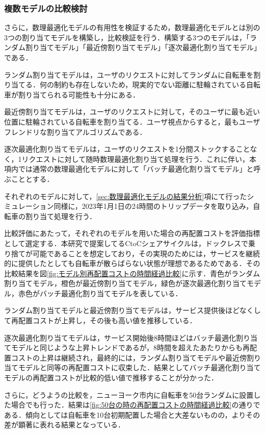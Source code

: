           
      \subsubsection{複数モデルの比較検討}
        \label{sec:複数モデルの比較検討}
          \par さらに，数理最適化モデルの有用性を検証するため，数理最適化モデルとは別の3つの割り当てモデルを構築し，比較検証を行う．構築する3つのモデルは，「ランダム割り当てモデル」「最近傍割り当てモデル」「逐次最適化割り当てモデル」である．
          \par ランダム割り当てモデルは，ユーザのリクエストに対してランダムに自転車を割り当てる．何の制約も存在しないため，現実的でない距離に駐輪されている自転車が割り当てられる可能性も十分にある．
          \par 最近傍割り当てモデルは，ユーザのリクエストに対して，そのユーザに最も近い位置に駐輪されている自転車を割り当てる．ユーザ視点からすると，最もユーザフレンドリな割り当てアルゴリズムである．
          \par 逐次最適化割り当てモデルは，ユーザのリクエストを1分間ストックすることなく，1リクエストに対して随時数理最適化割り当て処理を行う．これに伴い，本項内では通常の数理最適化モデルに対して「バッチ最適化割り当てモデル」と呼ぶこととする．
          \par それぞれのモデルに対して，\ref{sec:数理最適化モデルの結果分析}項にて行ったシミュレーション同様に，2023年1月1日の24時間のトリップデータを取り込み，自転車の割り当て処理を行う．
          \par 比較評価にあたって，それぞれのモデルを用いた場合の再配置コストを評価指標として選定する．本研究で提案してるCtoCシェアサイクルは，ドックレスで乗り捨てが可能であることを想定しており，その実現のためには，サービスを継続的に提供したとしても自転車が散らばらない状態が理想であるためである．その比較結果を図\ref{fig:モデル別再配置コストの時間経過比較}に示す．青色がランダム割り当てモデル，橙色が最近傍割り当てモデル，緑色が逐次最適化割り当てモデル，赤色がバッチ最適化割り当てモデルを表している．
          \par ランダム割り当てモデルと最近傍割り当てモデルは，サービス提供後ほどなくして再配置コストが上昇し，その後も高い値を推移している．
          \par 逐次最適化割り当てモデルは，サービス開始後8時間ほどはバッチ最適化割り当てモデルと同じような上昇トレンドであるが，8時間を超えたあたりからも再配置コストの上昇は継続され，最終的には，ランダム割り当てモデルや最近傍割り当てモデルと同等の再配置コストに収束した．結果としてバッチ最適化割り当てモデルの再配置コストが比較的低い値で推移することが分かった．
          \par さらに，どうようの比較を，ニューヨーク市内に自転車を50台ランダムに設置した場合でも行った．結果は\ref{fig:50台の時の再配置コストの時間経過比較}の通りである．傾向としては自転車を10台初期配置した場合と大差ないものの，よりその差が顕著に表れる結果となっている．

